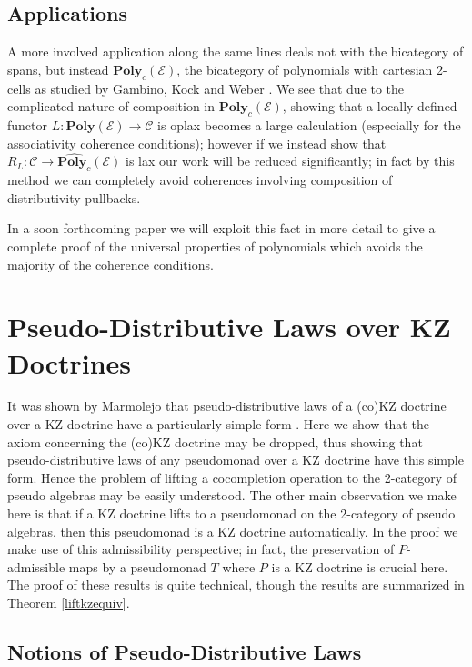 \documentclass[a4paper,oneside,english]{amsart}
\numberwithin{equation}{section}
\numberwithin{figure}{section}
\theoremstyle{plain}
\theoremstyle{definition}
\theoremstyle{remark}
\theoremstyle{definition}
\theoremstyle{plain}
\theoremstyle{plain}
\theoremstyle{plain}
\begin{document}
\subsection{Applications}

A more involved application along the same lines deals not with the
bicategory of spans, but instead $\mathbf{Poly}_{c}\left(\mathcal{E}\right)$,
the bicategory of polynomials with cartesian 2-cells as studied by
Gambino, Kock and Weber \cite{weber,gambinokock}. We see that due
to the complicated nature of composition in $\mathbf{Poly}_{c}\left(\mathcal{E}\right)$,
showing that a locally defined functor $L:\mathbf{Poly}\left(\mathcal{E}\right)\to\mathscr{C}$
is oplax becomes a large calculation (especially for the associativity
coherence conditions); however if we instead show that $R_{L}:\mathscr{C}\to\hat{\mathbf{Poly}_{c}}\left(\mathcal{E}\right)$
is lax our work will be reduced significantly; in fact by this method
we can completely avoid coherences involving composition of distributivity
pullbacks.

In a soon forthcoming paper we will exploit this fact in more detail
to give a complete proof of the universal properties of polynomials
which avoids the majority of the coherence conditions.

\section{Pseudo-Distributive Laws over KZ Doctrines\label{liftingkzdoctrines}}

It was shown by Marmolejo that pseudo-distributive laws of a (co)KZ
doctrine over a KZ doctrine have a particularly simple form \cite[Definition 11.4]{marm1999}.
Here we show that the axiom concerning the (co)KZ doctrine may be
dropped, thus showing that pseudo-distributive laws of any pseudomonad
over a KZ doctrine have this simple form. Hence the problem of lifting
a cocompletion operation to the 2-category of pseudo algebras may
be easily understood. The other main observation we make here is that
if a KZ doctrine lifts to a pseudomonad on the 2-category of pseudo
algebras, then this pseudomonad is a KZ doctrine automatically. In
the proof we make use of this admissibility perspective; in fact,
the preservation of $P$-admissible maps by a pseudomonad $T$ where
$P$ is a KZ doctrine is crucial here. The proof of these results
is quite technical, though the results are summarized in Theorem \ref{liftkzequiv}.

\subsection{Notions of Pseudo-Distributive Laws}
\end{document}
